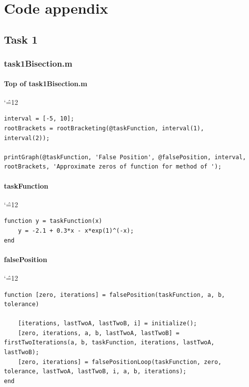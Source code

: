 \documentclass[12pt]{report}
\newenvironment{simplechar}{%
   \catcode`\^=12
}{}
\begin{document}
\chapter{Code appendix}

\section{Task 1}

\subsection{task1Bisection.m}

\subsubsection{Top of task1Bisection.m}
\begin{simplechar}
\begin{lstlisting}
interval = [-5, 10];
rootBrackets = rootBracketing(@taskFunction, interval(1), interval(2));

printGraph(@taskFunction, 'False Position', @falsePosition, interval, rootBrackets, 'Approximate zeros of function for method of ');
\end{lstlisting}
\end{simplechar}

\subsubsection{taskFunction}
\begin{simplechar}
\begin{lstlisting}
function y = taskFunction(x)
    y = -2.1 + 0.3*x - x*exp(1)^(-x);
end
\end{lstlisting}
\end{simplechar}

\newpage
\subsubsection{falsePosition}
\begin{simplechar}
\begin{lstlisting}
function [zero, iterations] = falsePosition(taskFunction, a, b, tolerance)

    [iterations, lastTwoA, lastTwoB, i] = initialize();
    [zero, iterations, a, b, lastTwoA, lastTwoB] = firstTwoIterations(a, b, taskFunction, iterations, lastTwoA, lastTwoB);
    [zero, iterations] = falsePositionLoop(taskFunction, zero, tolerance, lastTwoA, lastTwoB, i, a, b, iterations);
end
\end{lstlisting}
\end{simplechar}
\end{document}
